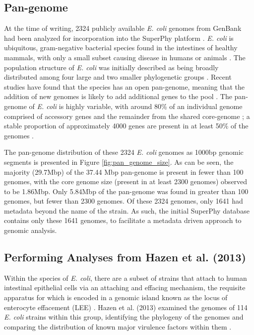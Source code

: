 \documentclass[doublespacing, linenumbers]{bmcart}
\begin{document}
\subsection{Pan-genome}
At the time of writing, 2324 publicly available \textit{E. coli} genomes from GenBank had been analyzed for incorporation into the SuperPhy platform  \cite{benson_genbank_2012}. \textit{E. coli} is ubiquitous, gram-negative bacterial species found in the intestines of healthy mammals, with only a small subset causing disease in humans or animals \cite{tenaillon_population_2010}. The population structure of \textit{E. coli} was initially described as being broadly distributed among four large and two smaller phylogenetic groups \cite{selander_methods_1986,goullet_comparative_1989}. Recent studies have found that the species has an open pan-genome, meaning that the addition of new genomes is likely to add additional genes to the pool \cite{medini_microbial_2005}. The pan-genome of \textit{E. coli} is highly variable, with around 80\% of an individual genome comprised of accessory genes and the remainder from the shared core-genome \cite{lukjancenko_comparison_2010}; a stable proportion of approximately 4000 genes are present in at least 50\% of the genomes \cite{gordienko_evolution_2013}.

The pan-genome distribution of these 2324 \textit{E. coli} genomes as 1000bp genomic segments is presented in Figure \ref{fig:pan_genome_size}. As can be seen, the majority (29.7Mbp) of the 37.44 Mbp pan-genome is present in fewer than 100 genomes, with the core genome size (present in at least 2300 genomes) observed to be 1.86Mbp. Only 5.84Mbp of the pan-genome was found in greater than 100 genomes, but fewer than 2300 genomes. Of these 2324 genomes, only 1641 had metadata beyond the name of the strain. As such, the initial SuperPhy database contains only these 1641 genomes, to facilitate a metadata driven approach to genomic analysis.

\subsection{Performing Analyses from Hazen et al. (2013)}
Within the species of \textit{E. coli}, there are a subset of strains that attach to human intestinal epithelial cells via an attaching and effacing mechanism, the requisite apparatus for which is encoded in a genomic island known as the locus of enterocyte effacement (LEE) \cite{croxen_recent_2013}.  Hazen et al. (2013) examined the genomes of 114  \textit{E. coli} strains within this group, identifying the phylogeny of the genomes and comparing the distribution of known major virulence factors within them \cite{hazen_refining_2013}. 
\end{document}
